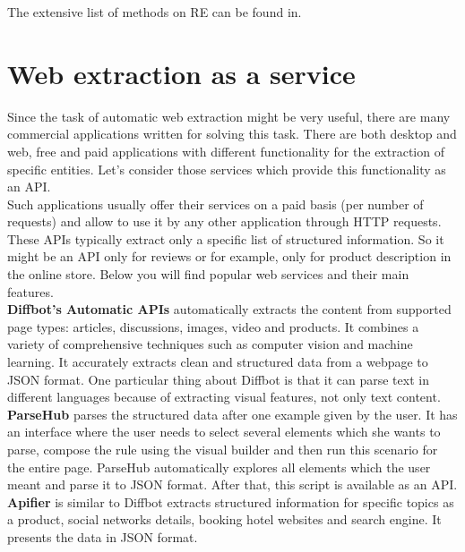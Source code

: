 The extensive list of methods on RE can be found in\cite{RegExtrSurvey}. 

\section{Web extraction as a service}

Since the task of automatic web extraction might be very useful, there are many commercial applications written for solving this task. There are both desktop and web, free and paid applications with different functionality for the extraction of specific entities. Let's consider those services which provide this functionality as an API.\\

Such applications usually offer their services on a paid basis (per number of requests) and allow to use it by any other application through HTTP requests. These APIs typically extract only a specific list of structured information. So it might be an API only for reviews or for example, only for product description in the online store. Below you will find popular web services and their main features.\\

\noindent \textbf{Diffbot's Automatic APIs}\cite{Diffbot} automatically extracts the content from supported page types: articles, discussions, images, video and products. It combines a variety of comprehensive techniques such as computer vision and machine learning. It accurately extracts clean and structured data from a webpage to JSON format. One particular thing about Diffbot is that it can parse text in different languages because of extracting visual features, not only text content.\\

\noindent\textbf{ParseHub}\cite{ParseHub} parses the structured data after one example given by the user. It has an interface where the user needs to select several elements which she wants to parse, compose the rule using the visual builder and then run this scenario for the entire page. ParseHub automatically explores all elements which the user meant and parse it to JSON format. After that, this script is available as an API.\\

\noindent\textbf{Apifier}\cite{Apifier} is similar to Diffbot extracts structured information for specific topics as a product, social networks details, booking hotel websites and search engine. It presents the data in JSON format.\\

